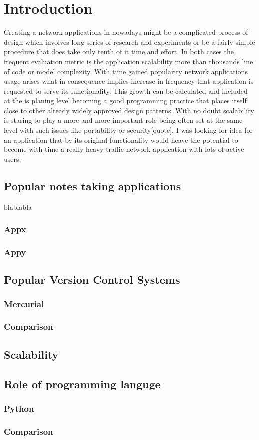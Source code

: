 \chapter{Introduction}
\label{sec:Introduction}
Creating a network applications in nowadays might be a complicated process of design which involves long series of research and experiments or be a fairly simple procedure that does take only tenth of it time and effort. In both cases the frequent evaluation metric is the application scalability more than thousands line of code or model complexity. With time gained popularity network  applications usage arises what in consequence implies increase in frequency that application is requested to serve its functionality. This growth can be calculated and included at the is planing level becoming a good programming practice that places itself close to other already widely approved design patterns. With no doubt scalability is staring to play a more and more important role being often set at the same level with such issues like portability or security[quote]. I was looking for idea for an application that by its original functionality would heave the potential to become with time a really heavy traffic network application with lots of active users.

\section{Popular notes taking applications}\label{sec:popular_apps} 
blablabla
\subsection{Appx}\label{subsec:x} 
\subsection{Appy}
\section{Popular Version Control Systems}\label{sec:popular_vcs}
\subsection{Mercurial}
\subsection{Comparison}
\section{Scalability}\label{sec:scalability}
\section{Role of programming languge}\label{sec:language}
\subsection{Python}
\subsection{Comparison}
